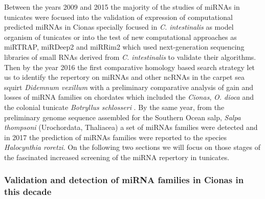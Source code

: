 \documentclass[graybox]{svmult}
\begin{document}
Between the years 2009 and 2015 the majority of the studies of miRNAs in tunicates were focused into the validation of expression of computational predicted miRNAs in Cionas specially focused in \textit{C. intestinalis} as model organism of tunicates or into the test of new computational approaches as miRTRAP, miRDeep2 and miRRim2 which used next-generation sequencing libraries of small RNAs derived from \textit{C. intestinalis} to validate their algorithms. Then by the year 2016 the first comparative homology based search strategy let us to identify the repertory on miRNAs and other ncRNAs in the carpet sea squirt \textit{Didemnum vexillum} with a preliminary comparative analysis of gain and losses of miRNA families on chordates which included the \textit{Cionas}, \textit{O. dioca} and the colonial tunicate \textit{Botryllus schlosseri} \cite{Velandia-Huerto2016}. By the same year, from the preliminary genome sequence assembled for the Southern Ocean salp, \textit{Salpa thompsoni} (Urochordata, Thaliacea) a set of miRNAs families were detected \cite{Jue2016} and in 2017 the prediction of miRNAs families were reported to the species \textit{Halocynthia roretzi}. On the following two sections we will focus on those stages of the fascinated increased screening of the miRNA repertory in tunicates.

\subsubsection{Validation and detection of miRNA families in Cionas in this decade}
\end{document}
